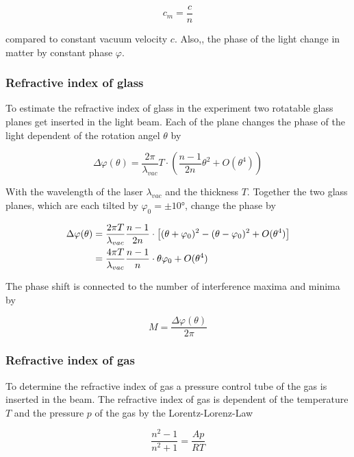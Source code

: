 \begin{equation}
	c_m=\frac{c}{n}
\end{equation}

compared to constant vacuum velocity $c$. Also,, the phase of the light change
in matter by constant phase $\varphi $.

\subsubsection{Refractive index of glass}
To estimate the refractive index of glass in the experiment two rotatable glass
planes get inserted in the light beam. Each of the plane changes the phase of
the light dependent of the rotation angel $\theta $ by

\begin{equation}
	\Delta \varphi(\theta ) =\frac{2\pi }{\lambda_{vac}}T \cdot \left(\frac{n-1}{2n}\theta ^2 +O(\theta ^4)  \right)
\end{equation}

With the wavelength of the laser $\lambda_{vac}$ and the thickness $T$.
Together the two glass planes, which are each tilted by $\varphi_0=\pm 10°$,
change the phase by

\begin{align}
	\Delta \varphi(\theta ) & =\frac{2\pi T}{\lambda_{vac}} \frac{n-1}{2n} \cdot \left[(\theta+\varphi_0)^2 - (\theta-\varphi_0)^2 +O(\theta ^4)  \right] \notag \\
	                        & =\frac{4\pi T}{\lambda_{vac}} \frac{n-1}{n} \cdot \theta\varphi_0 +O(\theta ^4) \label{eq:glass}
\end{align}

The phase shift is connected to the number of interference maxima and minima by

\begin{equation}
	M=\frac{\Delta \varphi(\theta)}{2\pi}
\end{equation}

\subsubsection{Refractive index of gas}
To determine the refractive index of gas a pressure control tube of the gas is
inserted in the beam. The refractive index of gas is dependent of the
temperature $T$ and the pressure $p$ of the gas by the Lorentz-Lorenz-Law

\begin{equation}
	\frac{n^2-1}{n^2+1}=\frac{Ap}{RT}
	\label{eq:Law}
\end{equation}

